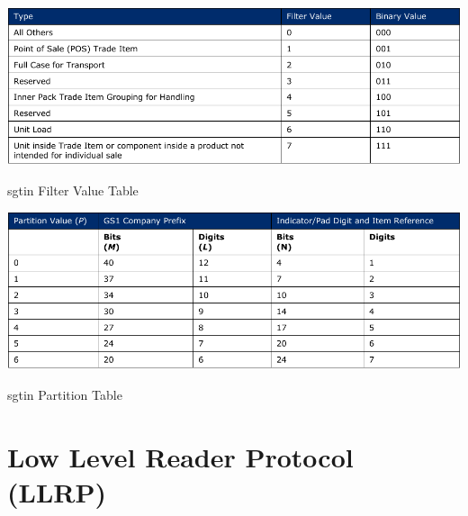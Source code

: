 \begin{table}[]
    \centering
    \includegraphics[width=\textwidth]{./figs/02-state-of-the-art/table_sgtin_filtervalues.pdf}
    \caption{\ac{sgtin} Filter Value Table~\cite{GS1EPCTDS}} 
    \label{tab:sgtinfiltervalues}
\end{table}

\begin{table}[]
    \centering
    \includegraphics[width=\textwidth]{./figs/02-state-of-the-art/table_partitionvalues.pdf}
    \caption{\ac{sgtin} Partition Table~\cite{GS1EPCTDS}} 
    \label{tab:partitiontable}
\end{table}

\section{Low Level Reader Protocol (LLRP)}





